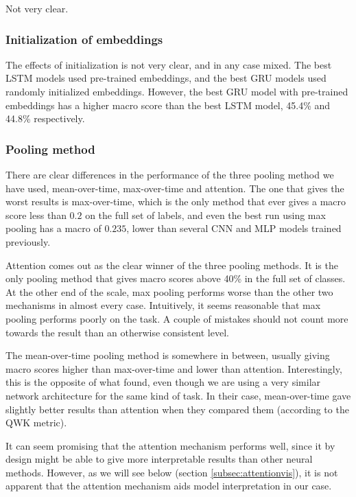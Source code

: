 Not very clear.


\subsubsection*{Initialization of embeddings}

The effects of initialization is not very clear, and in any case mixed.
The best LSTM models used pre-trained embeddings, and the best GRU models
used randomly initialized embeddings. However, the best GRU model with
pre-trained embeddings has a higher macro \FI score than the best LSTM model,
45.4\% and 44.8\% respectively.


\subsubsection*{Pooling method}

There are clear differences in the performance of the three pooling method we
have used, mean-over-time, max-over-time and attention. The one that gives
the worst results is max-over-time, which is the only method that ever gives
a macro \FI score less than $0.2$ on the full set of labels, and even the
best run using max pooling has a macro \FI of $0.235$, lower than several CNN
and MLP models trained previously.

Attention comes out as the clear winner of the three pooling methods. It is
the only pooling method that gives macro \FI scores above 40\% in the full
set of classes. At the other end of the scale, max pooling performs worse
than the other two mechanisms in almost every case. Intuitively, it seems
reasonable that max pooling performs poorly on the task. A couple of mistakes
should not count more towards the result than an otherwise consistent level.

The mean-over-time pooling method is somewhere in between, usually giving
macro \FI scores higher than max-over-time and lower than attention.
Interestingly, this is the opposite of what \textcite{taghipour16} found,
even though we are using a very similar network architecture for the same
kind of task. In their case, mean-over-time gave slightly better results than
attention when they compared them (according to the QWK metric).

It can seem promising that the attention mechanism performs well, since it by
design might be able to give more interpretable results than other neural
methods. However, as we will see below (section \ref{subsec:attentionvis}),
it is not apparent that the attention mechanism aids model interpretation in
our case.


